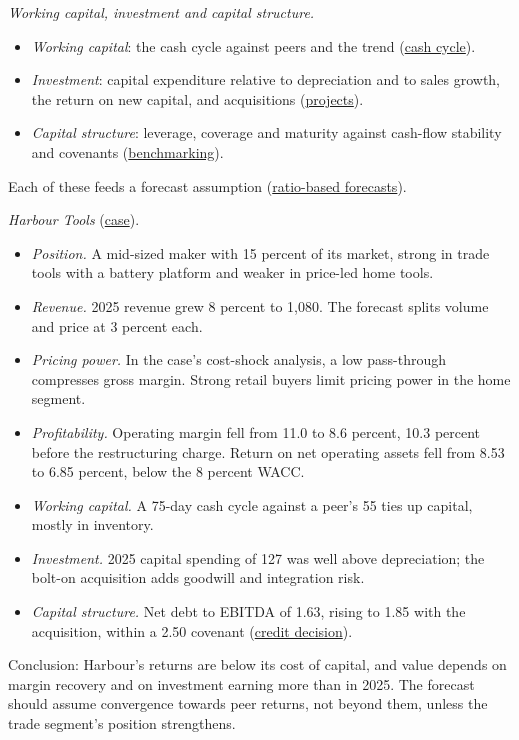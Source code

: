 \begin{qfmethod}
\emph{Working capital, investment and capital structure.}
\begin{itemize}
\item \emph{Working capital}: the cash cycle against peers and the trend (\hyperref[meth:cash-conversion-cycle]{cash cycle}).
\item \emph{Investment}: capital expenditure relative to depreciation and to sales growth, the return on new capital, and acquisitions (\hyperref[meth:capital-project-evaluation]{projects}).
\item \emph{Capital structure}: leverage, coverage and maturity against cash-flow stability and covenants (\hyperref[meth:capital-structure-benchmarking]{benchmarking}).
\end{itemize}
Each of these feeds a forecast assumption (\hyperref[meth:ratio-based-earnings-forecast]{ratio-based forecasts}).

 \emph{Harbour Tools} (\hyperref[ex:harbour-tools-statements]{case}).
\begin{itemize}
\item \emph{Position.} A mid-sized maker with 15 percent of its market, strong in trade tools with a battery platform and weaker in price-led home tools.
\item \emph{Revenue.} 2025 revenue grew 8 percent to 1,080. The forecast splits volume and price at 3 percent each.
\item \emph{Pricing power.} In the case's cost-shock analysis, a low pass-through compresses gross margin. Strong retail buyers limit pricing power in the home segment.
\item \emph{Profitability.} Operating margin fell from 11.0 to 8.6 percent, 10.3 percent before the restructuring charge. Return on net operating assets fell from 8.53 to 6.85 percent, below the 8 percent WACC.
\item \emph{Working capital.} A 75-day cash cycle against a peer's 55 ties up capital, mostly in inventory.
\item \emph{Investment.} 2025 capital spending of 127 was well above depreciation; the bolt-on acquisition adds goodwill and integration risk.
\item \emph{Capital structure.} Net debt to EBITDA of 1.63, rising to 1.85 with the acquisition, within a 2.50 covenant (\hyperref[ex:integrated-credit-decision]{credit decision}).
\end{itemize}
Conclusion: Harbour's returns are below its cost of capital, and value depends on margin recovery and on investment earning more than in 2025. The forecast should assume convergence towards peer returns, not beyond them, unless the trade segment's position strengthens.


\end{qfmethod}
